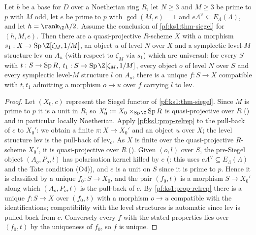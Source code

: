 \begin{proposition}\label{pf:ks1:prop-aux}
Let $b$ be a base for $D$ over a Noetherian ring $R$, let $N\ge3$ and $M\ge3$ be prime to $p$ with $M$ odd,
let $e$ be prime to $p$ with $\gcd(M,e)=1$ and $e\Lambda^\vee\subseteq E_\Lambda(\Lambda)$, and let
$h=\rank_\Z\Lambda/2$. Assume the conclusion of \cref{pf:ks1:thm-siegel} for $(h,M,e)$. Then there are a
quasi-projective $R$-scheme $X$ with a morphism $s_1:X\to\ksoneSp\Z[\zeta_M,1/M]$, an object $u$ of level $N$
over $X$ and a symplectic level-$M$ structure $\mathrm{lev}$ on $A_u$ (with respect to $\zeta_M$ via $s_1$)
which are universal: for every $S$ with $t:S\to\operatorname{Sp} R$, $t_1:S\to\ksoneSp\Z[\zeta_M,1/M]$, every object
$o$ of level $N$ over $S$ and every symplectic level-$M$ structure $l$ on $A_o$, there is a unique
$f:S\to X$ compatible with $t,t_1$ admitting a morphism $o\to u$ over $f$ carrying $l$ to $\mathrm{lev}$.
\end{proposition}

\begin{proof}
Let $(X_0,c)$ represent the Siegel functor of \cref{pf:ks1:thm-siegel}. Since $M$ is prime to $p$ it is a
unit in $R$, so $X_0':=X_0\times_{\ksoneSp\Z}\ksoneSp R$ is quasi-projective over $R$
() and in particular locally
Noetherian. Apply \cref{pf:ks1:prop-relrep} to the pull-back of $c$ to $X_0'$: we obtain a finite
$\pi:X\to X_0'$ and an object $u$ over $X$; the level structure $\mathrm{lev}$ is the pull-back of
$\mathrm{lev}_c$. As $X$ is finite over the quasi-projective $R$-scheme $X_0'$, it is quasi-projective over $R$
(). Given $(o,l)$ over $S$, the
pre-Siegel object $(A_o,P_o,l)$ has polarisation kernel killed by $e$
(: this uses
$e\Lambda^\vee\subseteq E_\Lambda(\Lambda)$ and the Tate condition (O4)), and $e$ is a unit on $S$ since it is
prime to $p$. Hence it is classified by a unique $f_0:S\to X_0$, and the pair $(f_0,t)$ is a morphism
$S\to X_0'$ along which $(A_o,P_o,l)$ is the pull-back of $c$. By \cref{pf:ks1:prop-relrep} there is a
unique $f:S\to X$ over $(f_0,t)$ with a morphism $o\to u$ compatible with the identifications; compatibility
with the level structures is automatic since $\mathrm{lev}$ is pulled back from $c$. Conversely every $f$ with
the stated properties lies over $(f_0,t)$ by the uniqueness of $f_0$, so $f$ is unique.
\end{proof}

